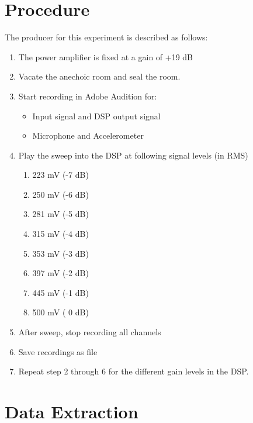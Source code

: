 \section{Procedure}\label{sec:SpeakerTestProcedure1}

The producer for this experiment is described as follows:
\vspace{-5mm}
\begin{enumerate}
\item The power amplifier is fixed at a gain of +19 dB
\item Vacate the anechoic room and seal the room.
\item Start recording in Adobe Audition for:
\begin{itemize}
\item Input signal and DSP output signal
\item Microphone and Accelerometer
\end{itemize}
\item Play the sweep into the DSP at following signal levels (in RMS)
\begin{enumerate}
	\item 223 mV (-7 dB)
	\item 250 mV (-6 dB)
	\item 281 mV (-5 dB)
	\item 315 mV (-4 dB)
	\item 353 mV (-3 dB)
	\item 397 mV (-2 dB)
	\item 445 mV (-1 dB)
	\item 500 mV ( 0 dB) 
\end{enumerate}
\item After sweep, stop recording all channels
\item Save recordings as  file
\item Repeat step 2 through 6 for the different gain levels in the DSP.
\end{enumerate}



%


\section{Data Extraction}

